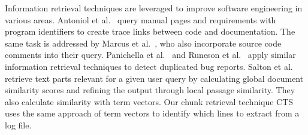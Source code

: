 \documentclass[\myrootdir/main.tex]{subfiles}
\begin{document}
Information retrieval techniques are leveraged to improve software engineering in various areas.
Antoniol et al.~\cite{antoniol2002recovering} query manual pages and requirements with program identifiers to create trace links between code and documentation.
The same task is addressed by Marcus et al.~\cite{marcus2005recovery}, who also incorporate source code comments into their query.
Panichella et al.~\cite{panichella2016parameterizing} and Runeson et al.~\cite{runeson2007detection} apply similar information retrieval techniques to detect duplicated bug reports.
Salton et al.~\cite{salton1993approaches} retrieve text parts relevant for a given user query by calculating global document similarity scores and refining the output through local passage similarity.
They also calculate similarity with term vectors.
Our chunk retrieval technique CTS uses the same approach of term vectors to identify which lines to extract from a log file.
\end{document}
